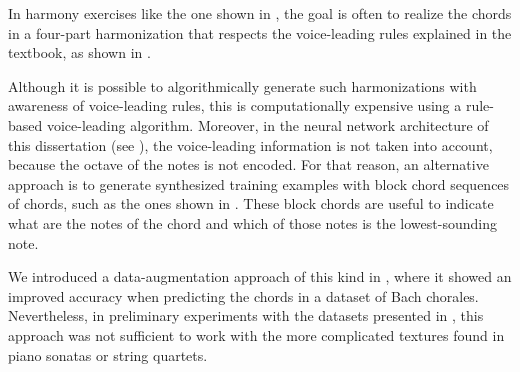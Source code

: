 
In harmony exercises like the one shown in
, the goal is often to
\gls{realize} the chords in a four-part harmonization that
respects the voice-leading rules explained in the textbook,
as shown in . 


Although it is possible to algorithmically generate such
harmonizations with awareness of voice-leading rules, this
is computationally expensive using a rule-based
voice-leading
algorithm.
Moreover, in the neural network architecture of this
dissertation (see ), the voice-leading
information is not taken into account, because the octave of
the notes is not encoded. For that reason, an alternative
approach is to generate synthesized training examples with
block chord sequences of chords, such as the ones shown in
. These block chords are useful
to indicate what are the notes of the chord and which of
those notes is the lowest-sounding note. 

We introduced a data-augmentation approach of this kind in
\textcite{napoleslopez2020harmonic}, where it showed an
improved accuracy when predicting the chords in a dataset of
Bach chorales. Nevertheless, in preliminary experiments with
the datasets presented in
, this approach was not
sufficient to work with the more complicated textures found
in piano sonatas or string quartets.

